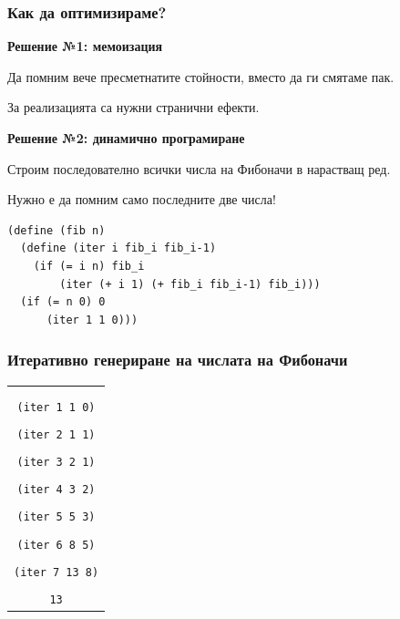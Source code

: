 \documentclass{beamer}
\begin{document}
\begin{frame}[fragile]
  \frametitle{Как да оптимизираме?}

  \textbf{Решение №1: мемоизация}

  Да помним вече пресметнатите стойности, вместо да ги смятаме пак.

  \pause
  \alert{За реализацията са нужни странични ефекти.}

  \pause
  \vspace{1em}

  \textbf{Решение №2: динамично програмиране}

  Строим последователно всички числа на Фибоначи в нарастващ ред.

  \pause
  \alert{Нужно е да помним само последните две числа!}

  \pause
\begin{verbatim}
(define (fib n)
  (define (iter i fib_i fib_i-1)
    (if (= i n) fib_i
        (iter (+ i 1) (+ fib_i fib_i-1) fib_i)))
  (if (= n 0) 0
      (iter 1 1 0)))
\end{verbatim}
\end{frame}

\begin{frame}
  \frametitle{Итеративно генериране на числата на Фибоначи}

  \small
  \begin{center}
    \begin{tabular}{c}
      \nxt{\tt{(fib 7)}\\
      \nxt{\bda\\
      \tt{(iter 1 1 0)}\\
      \nxt{\bda\\
      \tt{(iter 2 1 1)}\\
      \nxt{\bda\\
      \tt{(iter 3 2 1)}\\
      \nxt{\bda\\
      \tt{(iter 4 3 2)}\\
      \nxt{\bda\\
      \tt{(iter 5 5 3)}\\
      \nxt{\bda\\
      \tt{(iter 6 8 5)}\\
      \nxt{\bda\\
      \tt{(iter 7 13 8)}\\
      \nxt{\bda\\
      \tt{13}}}}}}}}}}
    \end{tabular}
  \end{center}
\end{frame}
\end{document}
